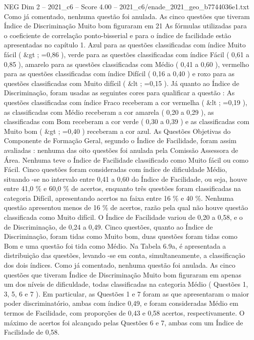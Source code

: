 \begin{textsample}{NEG Dim 2 – 2021\_c6 – Score 4.00 – 2021\_c6/enade\_2021\_geo\_b7744036e1.txt}
Como já comentado, nenhuma questão foi anulada.
As cinco questões que tiveram Índice de Discriminação Muito bom figuraram em 21 As fórmulas utilizadas para o coeficiente de correlação ponto-bisserial e para o índice de facilidade estão apresentadas no capítulo 1.
Azul para as questões classificadas com índice Muito fácil ( \&gt ; =0,86 ), verde para as questões classificadas com índice Fácil ( 0,61 a 0,85 ), amarelo para as questões classificadas com Médio ( 0,41 a 0,60 ), vermelho para as questões classificadas com índice Difícil ( 0,16 a 0,40 ) e roxo para as questões classificadas com Muito difícil ( \&lt ; =0,15 ).
Já quanto ao Índice de Discriminação, foram usadas as seguintes cores para qualificar a questão : As questões classificadas com índice Fraco receberam a cor vermelha ( \&lt ; =0,19 ), as classificadas com Médio receberam a cor amarela ( 0,20 a 0,29 ), as classificadas com Bom receberam a cor verde ( 0,30 a 0,39 ) e as classificadas com Muito bom ( \&gt ; =0,40 ) receberam a cor azul.
As Questões Objetivas do Componente de Formação Geral, segundo o Índice de Facilidade, foram assim avaliadas : nenhuma das oito questões foi anulada pela Comissão Assessora de Área.
Nenhuma teve o Índice de Facilidade classificado como Muito fácil ou como Fácil.
Cinco questões foram consideradas com índice de dificuldade Médio, situando -se no intervalo entre 0,41 a 0,60 do Índice de Facilidade, ou seja, houve entre 41,0 \% e 60,0 \% de acertos, enquanto três questões foram classificadas na categoria Difícil, apresentando acertos na faixa entre 16 \% e 40 \%.
Nenhuma questão apresentou menos de 16 \% de acertos, razão pela qual não houve questão classificada como Muito difícil.
O Índice de Facilidade variou de 0,20 a 0,58, e o de Discriminação, de 0,24 a 0,49.
Cinco questões, quanto ao Índice de Discriminação, foram tidas como Muito bom, duas questões foram tidas como Bom e uma questão foi tida como Médio.
Na Tabela 6.9a, é apresentada a distribuição das questões, levando -se em conta, simultaneamente, a classificação dos dois índices.
Como já comentado, nenhuma questão foi anulada.
As cinco questões que tiveram Índice de Discriminação Muito bom figuraram em apenas um dos níveis de dificuldade, todas classificadas na categoria Médio ( Questões 1, 3, 5, 6 e 7 ).
Em particular, as Questões 1 e 7 foram as que apresentaram o maior poder discriminatório, ambas com índice 0,49, e foram consideradas Médio em termos de Facilidade, com proporções de 0,43 e 0,58 acertos, respectivamente.
O máximo de acertos foi alcançado pelas Questões 6 e 7, ambas com um Índice de Facilidade de 0,58.

\end{textsample}
